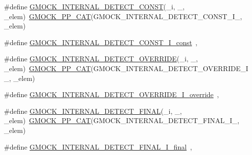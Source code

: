 \begin{DoxyCompactItemize}
\#define \mbox{\hyperlink{googletest-master_2googlemock_2include_2gmock_2gmock-function-mocker_8h_a3db348fab7c9ba65b3c9f4a7c1a9b3cc}{G\+M\+O\+C\+K\+\_\+\+I\+N\+T\+E\+R\+N\+A\+L\+\_\+\+D\+E\+T\+E\+C\+T\+\_\+\+C\+O\+N\+ST}}(\+\_\+i,  \+\_\+,  \+\_\+elem)~\mbox{\hyperlink{_obj__test_2lib_2googletest-master_2googlemock_2include_2gmock_2internal_2gmock-pp_8h_a108c52ffa81ab99348d23b8fa76fded3}{G\+M\+O\+C\+K\+\_\+\+P\+P\+\_\+\+C\+AT}}(G\+M\+O\+C\+K\+\_\+\+I\+N\+T\+E\+R\+N\+A\+L\+\_\+\+D\+E\+T\+E\+C\+T\+\_\+\+C\+O\+N\+S\+T\+\_\+\+I\+\_\+, \+\_\+elem)
\item 
\#define \mbox{\hyperlink{googletest-master_2googlemock_2include_2gmock_2gmock-function-mocker_8h_aa7d5cddff91ecb1062f9b09c92e1490b}{G\+M\+O\+C\+K\+\_\+\+I\+N\+T\+E\+R\+N\+A\+L\+\_\+\+D\+E\+T\+E\+C\+T\+\_\+\+C\+O\+N\+S\+T\+\_\+\+I\+\_\+const}}~,
\item 
\#define \mbox{\hyperlink{googletest-master_2googlemock_2include_2gmock_2gmock-function-mocker_8h_a78c435d1f1413ad21dce5459ce132ef3}{G\+M\+O\+C\+K\+\_\+\+I\+N\+T\+E\+R\+N\+A\+L\+\_\+\+D\+E\+T\+E\+C\+T\+\_\+\+O\+V\+E\+R\+R\+I\+DE}}(\+\_\+i,  \+\_\+,  \+\_\+elem)~\mbox{\hyperlink{_obj__test_2lib_2googletest-master_2googlemock_2include_2gmock_2internal_2gmock-pp_8h_a108c52ffa81ab99348d23b8fa76fded3}{G\+M\+O\+C\+K\+\_\+\+P\+P\+\_\+\+C\+AT}}(G\+M\+O\+C\+K\+\_\+\+I\+N\+T\+E\+R\+N\+A\+L\+\_\+\+D\+E\+T\+E\+C\+T\+\_\+\+O\+V\+E\+R\+R\+I\+D\+E\+\_\+\+I\+\_\+, \+\_\+elem)
\item 
\#define \mbox{\hyperlink{googletest-master_2googlemock_2include_2gmock_2gmock-function-mocker_8h_a291f5cec84814f28b56557f3e2c0623e}{G\+M\+O\+C\+K\+\_\+\+I\+N\+T\+E\+R\+N\+A\+L\+\_\+\+D\+E\+T\+E\+C\+T\+\_\+\+O\+V\+E\+R\+R\+I\+D\+E\+\_\+\+I\+\_\+override}}~,
\item 
\#define \mbox{\hyperlink{googletest-master_2googlemock_2include_2gmock_2gmock-function-mocker_8h_a2b0f53a8fea3a79d52582daf294737b0}{G\+M\+O\+C\+K\+\_\+\+I\+N\+T\+E\+R\+N\+A\+L\+\_\+\+D\+E\+T\+E\+C\+T\+\_\+\+F\+I\+N\+AL}}(\+\_\+i,  \+\_\+,  \+\_\+elem)~\mbox{\hyperlink{_obj__test_2lib_2googletest-master_2googlemock_2include_2gmock_2internal_2gmock-pp_8h_a108c52ffa81ab99348d23b8fa76fded3}{G\+M\+O\+C\+K\+\_\+\+P\+P\+\_\+\+C\+AT}}(G\+M\+O\+C\+K\+\_\+\+I\+N\+T\+E\+R\+N\+A\+L\+\_\+\+D\+E\+T\+E\+C\+T\+\_\+\+F\+I\+N\+A\+L\+\_\+\+I\+\_\+, \+\_\+elem)
\item 
\#define \mbox{\hyperlink{googletest-master_2googlemock_2include_2gmock_2gmock-function-mocker_8h_a0bc72a48cf71bb605b47e52f94a97dd9}{G\+M\+O\+C\+K\+\_\+\+I\+N\+T\+E\+R\+N\+A\+L\+\_\+\+D\+E\+T\+E\+C\+T\+\_\+\+F\+I\+N\+A\+L\+\_\+\+I\+\_\+final}}~,

\end{DoxyCompactItemize}
